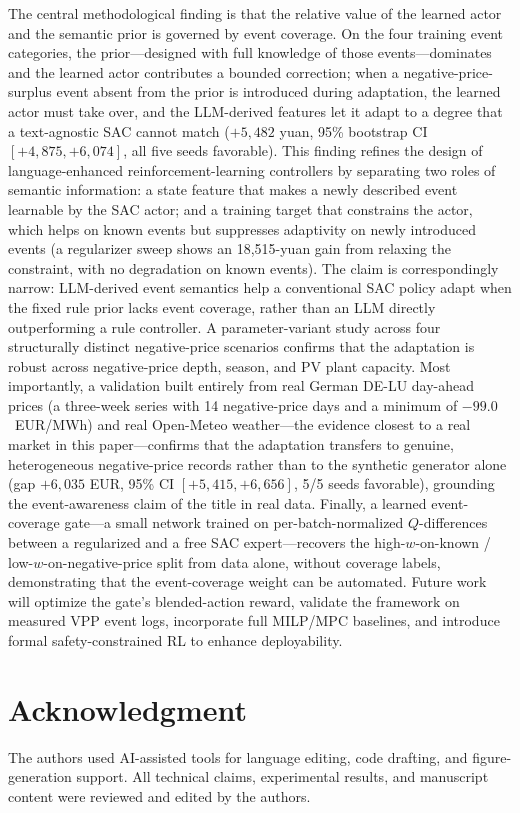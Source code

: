 \documentclass{ieeeaccess}
\begin{document}
The central methodological finding is that the relative value of the learned actor and the semantic prior is governed by event coverage. On the four training event categories, the prior---designed with full knowledge of those events---dominates and the learned actor contributes a bounded correction; when a negative-price-surplus event absent from the prior is introduced during adaptation, the learned actor must take over, and the LLM-derived features let it adapt to a degree that a text-agnostic SAC cannot match ($+5{,}482$ yuan, 95\% bootstrap CI $[+4{,}875, +6{,}074]$, all five seeds favorable). This finding refines the design of language-enhanced reinforcement-learning controllers by separating two roles of semantic information: a state feature that makes a newly described event learnable by the SAC actor; and a training target that constrains the actor, which helps on known events but suppresses adaptivity on newly introduced events (a regularizer sweep shows an 18{,}515-yuan gain from relaxing the constraint, with no degradation on known events). The claim is correspondingly narrow: LLM-derived event semantics help a conventional SAC policy adapt when the fixed rule prior lacks event coverage, rather than an LLM directly outperforming a rule controller. A parameter-variant study across four structurally distinct negative-price scenarios confirms that the adaptation is robust across negative-price depth, season, and PV plant capacity. Most importantly, a validation built entirely from real German DE-LU day-ahead prices (a three-week series with 14 negative-price days and a minimum of $-99.0$~EUR/MWh) and real Open-Meteo weather---the evidence closest to a real market in this paper---confirms that the adaptation transfers to genuine, heterogeneous negative-price records rather than to the synthetic generator alone (gap $+6{,}035$ EUR, 95\% CI $[+5{,}415, +6{,}656]$, 5/5 seeds favorable), grounding the event-awareness claim of the title in real data. Finally, a learned event-coverage gate---a small network trained on per-batch-normalized $Q$-differences between a regularized and a free SAC expert---recovers the high-$w$-on-known / low-$w$-on-negative-price split from data alone, without coverage labels, demonstrating that the event-coverage weight can be automated. Future work will optimize the gate's blended-action reward, validate the framework on measured VPP event logs, incorporate full MILP/MPC baselines, and introduce formal safety-constrained RL to enhance deployability.

\section*{Acknowledgment}
The authors used AI-assisted tools for language editing, code drafting, and figure-generation support. All technical claims, experimental results, and manuscript content were reviewed and edited by the authors.
\end{document}
